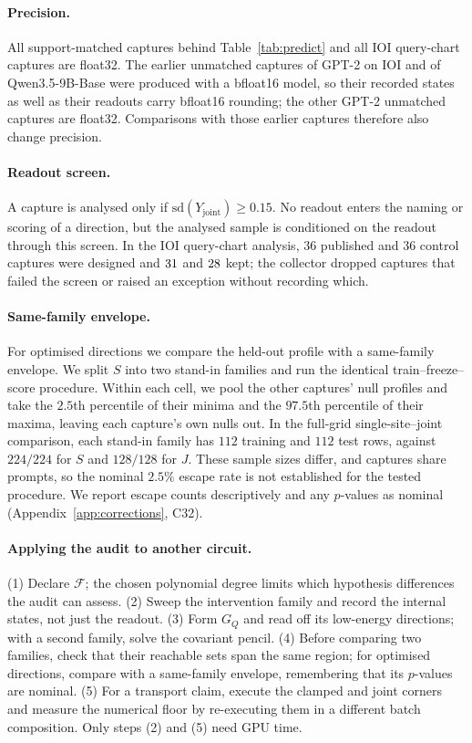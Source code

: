 \paragraph{Precision.} All support-matched captures behind Table~\ref{tab:predict} and all IOI query-chart captures
are float32. The earlier unmatched captures of GPT-2 on IOI and of Qwen3.5-9B-Base were produced with a bfloat16
model, so their recorded states as well as their readouts carry bfloat16 rounding; the other GPT-2 unmatched captures
are float32. Comparisons with those earlier captures therefore also change precision.

\paragraph{Readout screen.} A capture is analysed only if $\mathrm{sd}(Y_{\mathrm{joint}})\ge0.15$. No readout enters
the naming or scoring of a direction, but the analysed sample is conditioned on the readout through this screen.
In the IOI query-chart analysis, $36$ published and $36$ control captures were designed and $31$ and $28$ kept;
the collector dropped captures that failed the screen or raised an exception without recording which.

\paragraph{Same-family envelope.} For optimised directions we compare the held-out profile with a same-family envelope.
We split $S$ into two stand-in families and run the identical train--freeze--score procedure. Within each cell, we
pool the other captures' null profiles and take the $2.5$th percentile of their minima and the $97.5$th percentile
of their maxima, leaving each capture's own nulls out. In the full-grid single-site--joint comparison, each stand-in
family has $112$ training and $112$ test rows, against $224/224$ for $S$ and $128/128$ for $J$. These sample sizes differ,
and captures share prompts, so the nominal $2.5\%$ escape rate is not established for the tested procedure. We report escape counts
descriptively and any $p$-values as nominal (Appendix~\ref{app:corrections}, C32).

\paragraph{Applying the audit to another circuit.} (1) Declare $\mathcal F$; the chosen polynomial degree limits which
hypothesis differences the audit can assess. (2) Sweep the intervention family and record the internal states, not just
the readout. (3) Form $G_Q$ and read off its low-energy directions; with a second family, solve the covariant
pencil. (4) Before comparing two families, check that their reachable sets span the same region; for optimised
directions, compare with a same-family envelope, remembering that its $p$-values are nominal. (5) For a transport
claim, execute the clamped and joint corners and measure the numerical floor by re-executing them in a different
batch composition. Only steps (2) and (5) need GPU time.

